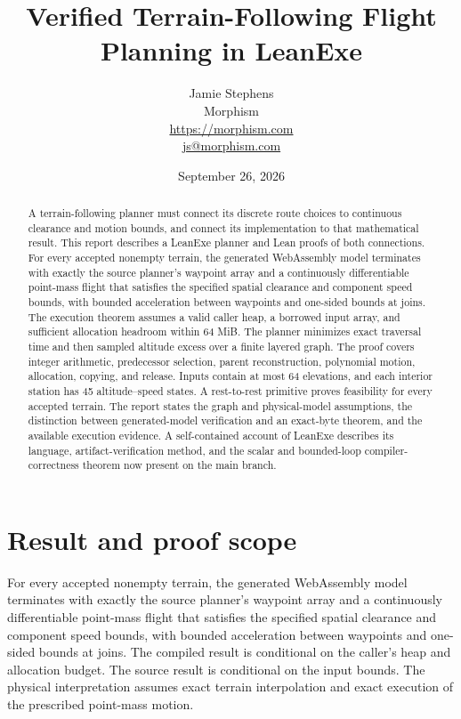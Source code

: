 \documentclass[11pt]{article}
\title{Verified Terrain-Following Flight Planning in LeanExe}
\author{Jamie Stephens\\Morphism\\\url{https://morphism.com}\\\href{mailto:js@morphism.com}{js@morphism.com}}
\date{September 26, 2026}
\begin{document}
\maketitle
\begin{abstract}
A terrain-following planner must connect its discrete route choices to continuous clearance and motion bounds, and connect its implementation to that mathematical result.  This report describes a LeanExe planner and Lean proofs of both connections.  For every accepted nonempty terrain, the generated WebAssembly model terminates with exactly the source planner's waypoint array and a continuously differentiable point-mass flight that satisfies the specified spatial clearance and component speed bounds, with bounded acceleration between waypoints and one-sided bounds at joins.  The execution theorem assumes a valid caller heap, a borrowed input array, and sufficient allocation headroom within 64 MiB.  The planner minimizes exact traversal time and then sampled altitude excess over a finite layered graph.  The proof covers integer arithmetic, predecessor selection, parent reconstruction, polynomial motion, allocation, copying, and release.  Inputs contain at most 64 elevations, and each interior station has 45 altitude--speed states.  A rest-to-rest primitive proves feasibility for every accepted terrain.  The report states the graph and physical-model assumptions, the distinction between generated-model verification and an exact-byte theorem, and the available execution evidence.  A self-contained account of LeanExe describes its language, artifact-verification method, and the scalar and bounded-loop compiler-correctness theorem now present on the main branch.
\end{abstract}

\section{Result and proof scope}

For every accepted nonempty terrain, the generated WebAssembly model terminates with exactly the source planner's waypoint array and a continuously differentiable point-mass flight that satisfies the specified spatial clearance and component speed bounds, with bounded acceleration between waypoints and one-sided bounds at joins.  The compiled result is conditional on the caller's heap and allocation budget.  The source result is conditional on the input bounds.  The physical interpretation assumes exact terrain interpolation and exact execution of the prescribed point-mass motion.
\end{document}
